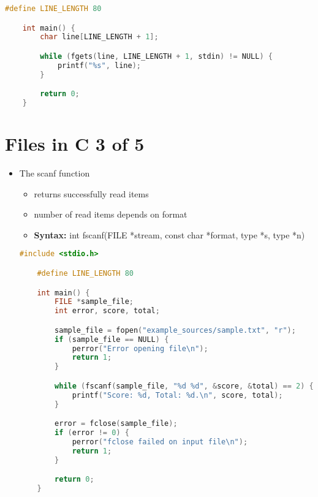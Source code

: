 \documentclass[12pt]{article}
\begin{document}
\begin{itemize}
\begin{lstlisting}[language=c]
    #define LINE_LENGTH 80

    int main() {
        char line[LINE_LENGTH + 1];

        while (fgets(line, LINE_LENGTH + 1, stdin) != NULL) {
            printf("%s", line);
        }

        return 0;
    }
    \end{lstlisting}
\end{itemize}

\bigskip

\section*{Files in C 3 of 5}

\bigskip

\begin{itemize}
    \item The scanf function
    \begin{itemize}
        \item returns successfully read items
        \item number of read items depends on format
        \item \textbf{Syntax:} int fscanf(FILE *stream, const char *format, type *s,  type *n)
    \end{itemize}

    \begin{lstlisting}[language=c]
    #include <stdio.h>

    #define LINE_LENGTH 80

    int main() {
        FILE *sample_file;
        int error, score, total;

        sample_file = fopen("example_sources/sample.txt", "r");
        if (sample_file == NULL) {
            perror("Error opening file\n");
            return 1;
        }

        while (fscanf(sample_file, "%d %d", &score, &total) == 2) { //<- ==2 means each fscan must return 2 values, one for each col.
            printf("Score: %d, Total: %d.\n", score, total);
        }

        error = fclose(sample_file);
        if (error != 0) {
            perror("fclose failed on input file\n");
            return 1;
        }

        return 0;
    }
    \end{lstlisting}
\end{itemize}
\end{document}
